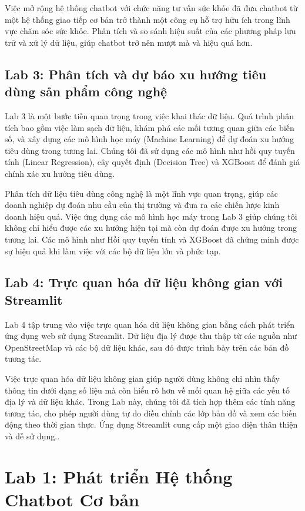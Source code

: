 \documentclass[a4paper,12pt]{report}
\begin{document}
Việc mở rộng hệ thống chatbot với chức năng tư vấn sức khỏe đã đưa chatbot từ một hệ thống giao tiếp cơ bản trở thành một công cụ hỗ trợ hữu ích trong lĩnh vực chăm sóc sức khỏe. Phân tích và so sánh hiệu suất của các phương pháp lưu trữ và xử lý dữ liệu, giúp chatbot trở nên mượt mà và hiệu quả hơn.

\section{Lab 3: Phân tích và dự báo xu hướng tiêu dùng sản phẩm công nghệ}
Lab 3 là một bước tiến quan trọng trong việc khai thác dữ liệu. Quá trình phân tích bao gồm việc làm sạch dữ liệu, khám phá các mối tương quan giữa các biến số, và xây dựng các mô hình học máy (Machine Learning) để dự đoán xu hướng tiêu dùng trong tương lai. Chúng tôi đã sử dụng các mô hình như hồi quy tuyến tính (Linear Regression), cây quyết định (Decision Tree) và XGBoost để đánh giá chính xác xu hướng tiêu dùng.

Phân tích dữ liệu tiêu dùng công nghệ là một lĩnh vực quan trọng, giúp các doanh nghiệp dự đoán nhu cầu của thị trường và đưa ra các chiến lược kinh doanh hiệu quả. Việc ứng dụng các mô hình học máy trong Lab 3 giúp chúng tôi không chỉ hiểu được các xu hướng hiện tại mà còn dự đoán được xu hướng trong tương lai. Các mô hình như Hồi quy tuyến tính và XGBoost đã chứng minh được sự hiệu quả khi làm việc với các bộ dữ liệu lớn và phức tạp.

\section{Lab 4: Trực quan hóa dữ liệu không gian với Streamlit}
Lab 4 tập trung vào việc trực quan hóa dữ liệu không gian bằng cách phát triển ứng dụng web sử dụng Streamlit. Dữ liệu địa lý được thu thập từ các nguồn như OpenStreetMap và các bộ dữ liệu khác, sau đó được trình bày trên các bản đồ tương tác.

Việc trực quan hóa dữ liệu không gian giúp người dùng không chỉ nhìn thấy thông tin dưới dạng số liệu mà còn hiểu rõ hơn về mối quan hệ giữa các yếu tố địa lý và dữ liệu khác. Trong Lab này, chúng tôi đã tích hợp thêm các tính năng tương tác, cho phép người dùng tự do điều chỉnh các lớp bản đồ và xem các biến động theo thời gian thực. Ứng dụng Streamlit cung cấp một giao diện thân thiện và dễ sử dụng..

\chapter{Lab 1: Phát triển Hệ thống Chatbot Cơ bản}
\end{document}
